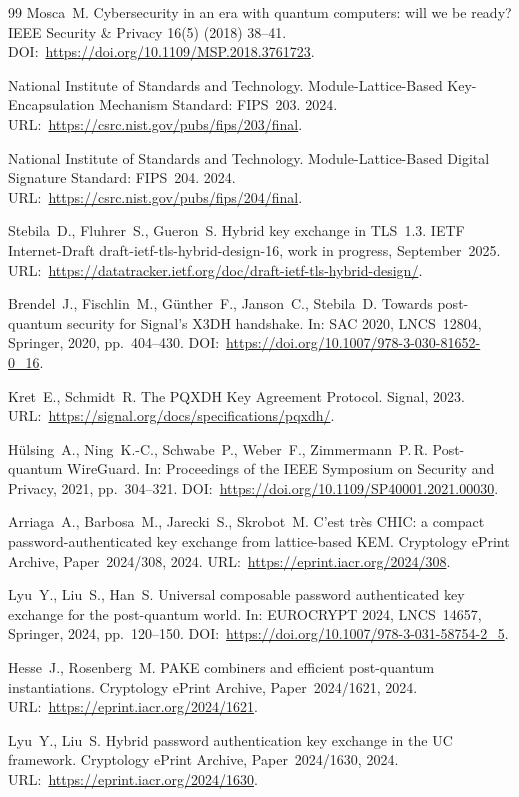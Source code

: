 \documentclass{ieeeijc}
\theoremstyle{remark}
\begin{document}
\begin{thebibliography}{99}
Mosca~M.
Cybersecurity in an era with quantum computers: will we be ready?
IEEE Security \& Privacy 16(5) (2018) 38--41.
DOI:~\url{https://doi.org/10.1109/MSP.2018.3761723}.

National Institute of Standards and Technology.
Module-Lattice-Based Key-Encapsulation Mechanism Standard: FIPS~203.
2024.
URL:~\url{https://csrc.nist.gov/pubs/fips/203/final}.

National Institute of Standards and Technology.
Module-Lattice-Based Digital Signature Standard: FIPS~204.
2024.
URL:~\url{https://csrc.nist.gov/pubs/fips/204/final}.

Stebila~D., Fluhrer~S., Gueron~S.
Hybrid key exchange in TLS~1.3.
IETF Internet-Draft draft-ietf-tls-hybrid-design-16, work in progress, September~2025.
URL:~\url{https://datatracker.ietf.org/doc/draft-ietf-tls-hybrid-design/}.

Brendel~J., Fischlin~M., G\"{u}nther~F., Janson~C., Stebila~D.
Towards post-quantum security for Signal's X3DH handshake.
In: SAC 2020, LNCS~12804, Springer, 2020, pp.~404--430.
DOI:~\url{https://doi.org/10.1007/978-3-030-81652-0_16}.

Kret~E., Schmidt~R.
The PQXDH Key Agreement Protocol.
Signal, 2023.
URL:~\url{https://signal.org/docs/specifications/pqxdh/}.

H\"{u}lsing~A., Ning~K.-C., Schwabe~P., Weber~F., Zimmermann~P.\,R.
Post-quantum WireGuard.
In: Proceedings of the IEEE Symposium on Security and Privacy, 2021, pp.~304--321.
DOI:~\url{https://doi.org/10.1109/SP40001.2021.00030}.

Arriaga~A., Barbosa~M., Jarecki~S., Skrobot~M.
C'est tr\`es CHIC: a compact password-authenticated key exchange from lattice-based KEM.
Cryptology ePrint Archive, Paper~2024/308, 2024.
URL:~\url{https://eprint.iacr.org/2024/308}.

Lyu~Y., Liu~S., Han~S.
Universal composable password authenticated key exchange for the post-quantum world.
In: EUROCRYPT 2024, LNCS~14657, Springer, 2024, pp.~120--150.
DOI:~\url{https://doi.org/10.1007/978-3-031-58754-2_5}.

Hesse~J., Rosenberg~M.
PAKE combiners and efficient post-quantum instantiations.
Cryptology ePrint Archive, Paper~2024/1621, 2024.
URL:~\url{https://eprint.iacr.org/2024/1621}.

Lyu~Y., Liu~S.
Hybrid password authentication key exchange in the UC framework.
Cryptology ePrint Archive, Paper~2024/1630, 2024.
URL:~\url{https://eprint.iacr.org/2024/1630}.


\end{thebibliography}
\end{document}
